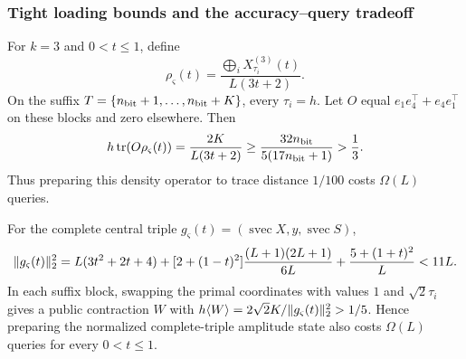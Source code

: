 \subsubsection{Tight loading bounds and the accuracy--query tradeoff}
\label{sec:sdp-schur-frontier}

For $k=3$ and $0<t\leq1$, define
\begin{equation}
 \rho_\varsigma(t)=\frac{\bigoplus_iX_{\tau_i}^{(3)}(t)}{L(3t+2)}.
\end{equation}
On the suffix $T=\{n_{\rm bit}+1,\ldots,n_{\rm bit}+K\}$, every
$\tau_i=h$.  Let $O$ equal $e_1e_4^\top+e_4e_1^\top$ on these blocks and zero
elsewhere.  Then
\begin{equation}
 h\operatorname{tr}(O\rho_\varsigma(t))=\frac{2K}{L(3t+2)}
 \geq\frac{32n_{\rm bit}}{5(17n_{\rm bit}+1)}>\frac13.    \label{eq:sdp-schur-density-bias}
\end{equation}
Thus preparing this density operator to trace distance $1/100$ costs
$\Omega(L)$ queries.

For the complete central triple
$g_\varsigma(t)=(\operatorname{svec}X,y,\operatorname{svec}S)$,
\begin{equation}
 \lVert g_\varsigma(t)\rVert_2^2
 =L(3t^2+2t+4)+[2+(1-t)^2]\frac{(L+1)(2L+1)}{6L}
 +\frac{5+(1+t)^2}{L}<11L.                                \label{eq:sdp-schur-triple-norm}
\end{equation}
In each suffix block, swapping the primal coordinates with values $1$ and
$\sqrt2\tau_i$ gives a public contraction $W$ with
$h\langle W\rangle=2\sqrt2K/\lVert g_\varsigma(t)\rVert_2^2>1/5$.
Hence preparing the normalized complete-triple amplitude state also costs
$\Omega(L)$ queries for every $0<t\leq1$.

